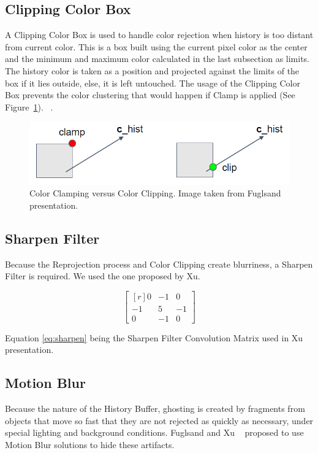 \documentclass{cslthse-msc}
\begin{document}
\subsection{Clipping Color Box} 
A Clipping Color Box is used to handle color rejection when history is too distant from current color. This is a box built using the current pixel color as the center and the minimum and maximum color calculated in the last subsection as limits. The history color is taken as a position and projected against the limits of the box if it lies outside, else, it is left untouched. The usage of the Clipping Color Box prevents the color clustering that would happen if Clamp is applied (See Figure~\ref{fig:clippingbox}). ~\cite{Fuglsand2016}.

\begin{figure}[!hbt]
	\centering
	\includegraphics[scale=0.4]{images/clipping_box.png}
	\caption{Color Clamping versus Color Clipping. Image taken from Fuglsand presentation. \protect\cite{Fuglsand2016}}\label{fig:clippingbox}
\end{figure}


\subsection{Sharpen Filter} 
Because the Reprojection process and Color Clipping create blurriness, a Sharpen Filter is required. We used the one proposed by Xu. ~\cite{XU2016}

\begin{equation} \label{eq:sharpen}
\begin{bmatrix*}[r]
0 & -1 &  0 \\
-1 &  5 & -1 \\
0 & -1 &  0
\end{bmatrix*}
\end{equation}

Equation \ref{eq:sharpen} being the Sharpen Filter Convolution Matrix  used in Xu presentation. \protect\cite{XU2016}

\subsection{Motion Blur}
Because the nature of the History Buffer, ghosting is created by fragments from objects that move so fast that they are not rejected as quickly as necessary, under special lighting and background conditions. Fuglsand and Xu ~\cite{Fuglsand2016,XU2016} proposed to use Motion Blur solutions to hide these artifacts.
\end{document}
